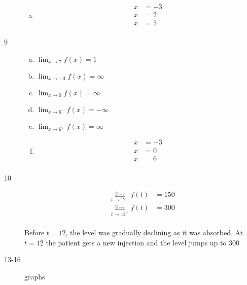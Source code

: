 \documentclass[letterpaper, landscape]{exam}
\begin{document}
\begin{description}
\begin{enumerate}[(a)]
          \item
            \begin{align*}
              x & = -3 \\
              x & = 2 \\
              x & = 5 \\
            \end{align*}

        \end{enumerate}

      \item[9]
        \begin{enumerate}[(a)]
          \item $\lim_{x \to 7} f(x) = \boxed{ 1 }$

          \item $\lim_{x \to -3} f(x) = \boxed{ \infty }$

          \item $\lim_{x \to 0} f(x) = \boxed{ \infty }$

          \item $\lim_{x \to 6^-} f(x) = \boxed{ -\infty }$

          \item $\lim_{x \to 6^+} f(x) = \boxed{ \infty }$

          \item
            \begin{align*}
              x & = -3 \\
              x & = 0 \\
              x & = 6 \\
            \end{align*}

        \end{enumerate}

      \item[10]
        \begin{align*}
          \lim_{t \to 12^-} f(t) &= \boxed{ 150 } \\
          \lim_{t \to 12^+} f(t) &= \boxed{ 300 } \\
        \end{align*}

        Before $t = 12$, the level was gradually declining as it was absorbed.
        At $t = 12$ the patient gets a new injection and the level jumps up to 300

      \item[13-16] graphs



\end{description}
\end{document}
